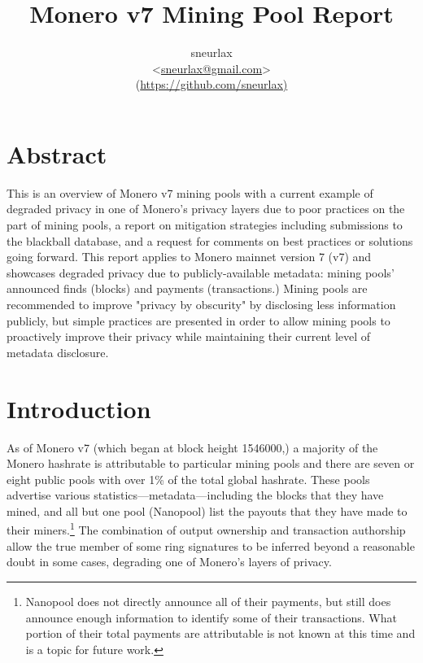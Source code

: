 \documentclass[notitlepage]{report}
\title{Monero v7 Mining Pool Report}
\author{sneurlax \\
\textless\url{sneurlax@gmail.com}\textgreater \\
(\url{https://github.com/sneurlax)}}
\begin{document}
\maketitle
\thispagestyle{empty}

\section*{Abstract}

This is an overview of Monero v7 mining pools with a current example of degraded privacy in one of Monero's privacy layers due to poor practices on the part of mining pools, a report on mitigation strategies including submissions to the blackball database, and a request for comments on best practices or solutions going forward.  This report applies to Monero mainnet version 7 (v7) and showcases degraded privacy due to publicly-available metadata: mining pools' announced finds (blocks) and payments (transactions.)  Mining pools are recommended to improve "privacy by obscurity" by disclosing less information publicly, but simple practices are presented in order to allow mining pools to proactively improve their privacy while maintaining their current level of metadata disclosure.

\clearpage

\tableofcontents

\section{Introduction}

\setcounter{page}{1}

As of Monero v7 (which began at block height 1546000,) a majority of the Monero hashrate is attributable to particular mining pools and there are seven or eight public pools with over 1\% of the total global hashrate.  These pools advertise various statistics---metadata---including the blocks that they have mined, and all but one pool (Nanopool) list the payouts that they have made to their miners.\footnote{Nanopool does not directly announce all of their payments, but still does announce enough information to identify some of their transactions.  What portion of their total payments are attributable is not known at this time and is a topic for future work.}  The combination of output ownership and transaction authorship allow the true member of some ring signatures to be inferred beyond a reasonable doubt in some cases, degrading one of Monero's layers of privacy.
\end{document}
